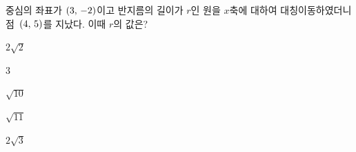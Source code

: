 중심의 좌표가 $(3,\mkern3mu -2)$이고 반지름의 길이가 $r$인 원을 $x$축에 대하여 대칭이동하였더니 점~$(4,\mkern3mu 5)$를 지났다. 이때 $r$의 값은?
\begin{choices32}{\rule[-3ex]{0pt}{8ex}$2\sqrt{2}$}{\rule[-3ex]{0pt}{8ex}$3$}{\rule[-3ex]{0pt}{8ex}$\sqrt{10}$}{\rule[-3ex]{0pt}{8ex}$\sqrt{11}$}{\rule[-3ex]{0pt}{8ex}$2\sqrt{3}$}\end{choices32}
